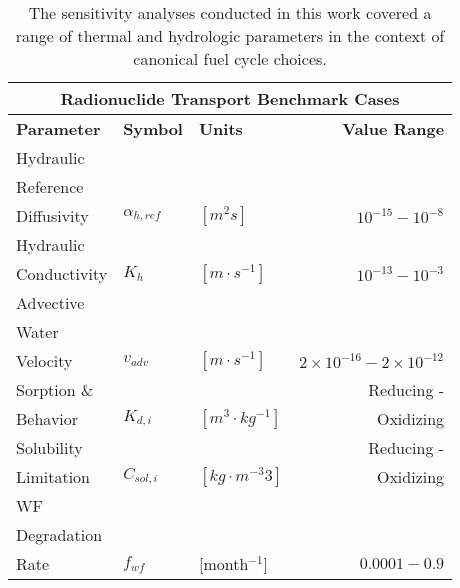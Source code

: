 
\begin{table}[ht!]
\centering
\footnotesize{
  \begin{tabularx}{\textwidth}{|X|l|l|r|}
\multicolumn{4}{c}{\textbf{Radionuclide Transport Benchmark Cases}}\\
\hline
\textbf{Parameter} & \textbf{Symbol} & \textbf{Units} & \textbf{Value Range} \\
\hline
Hydraulic & & & \\
Reference & & & \\
Diffusivity& $\alpha_{h,ref}$& $[m^2s]$ & $10^{-15} - 10^{-8}$ \\
\hline
Hydraulic & & & \\
Conductivity& $K_{h}$& $[m \cdot s^{-1}]$ & $10^{-13} - 10^{-3}$ \\
\hline
Advective  & & & \\
Water & & & \\
Velocity & $v_{adv}$ & $[m\cdot s^{-1}]$ & $2\times10^{-16}-2\times10^{-12}$ \\
\hline
Sorption \& & & & Reducing - \\
Behavior & $K_{d,i}$& $[m^3\cdot kg^{-1}]$ & Oxidizing \\
\hline
Solubility &  & & Reducing -\\
Limitation & $C_{sol,i}$ & $[kg\cdot m^{-3}3]$& Oxidizing \\
\hline
WF& & & \\
Degradation& & & \\
Rate& $f_{wf}$ & [month$^{-1}$]& $0.0001-0.9$ \\
\hline
\end{tabularx}
\caption{The sensitivity analyses conducted in this work covered a range of 
thermal and hydrologic parameters in the context of canonical fuel cycle choices.}
}
\label{tab:nuclide_bench_tab}
\end{table}

